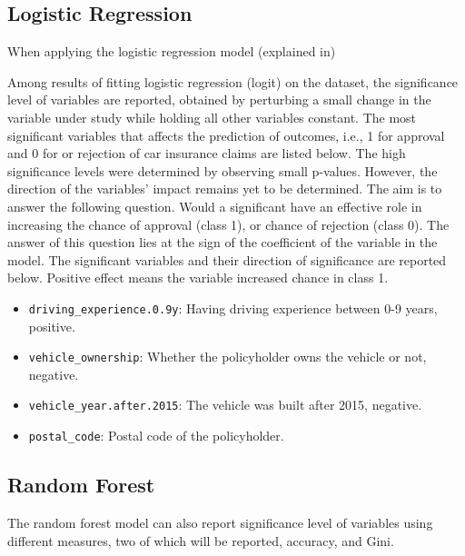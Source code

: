 \documentclass{article}
\providecommand{\tightlist}{%
  \setlength{\itemsep}{0pt}\setlength{\parskip}{0pt}}
\begin{document}
\hypertarget{logistic-regression}{%
\subsection{\texorpdfstring{Logistic Regression
\label{subsec:logit}}{Logistic Regression }}\label{logistic-regression}}

When applying the logistic regression model (explained in)

Among results of fitting logistic regression (logit) on the dataset, the
significance level of variables are reported, obtained by perturbing a
small change in the variable under study while holding all other
variables constant. The most significant variables that affects the
prediction of outcomes, i.e., 1 for approval and 0 for or rejection of
car insurance claims are listed below. The high significance levels were
determined by observing small p-values. However, the direction of the
variables' impact remains yet to be determined. The aim is to answer the
following question. Would a significant have an effective role in
increasing the chance of approval (class 1), or chance of rejection
(class 0). The answer of this question lies at the sign of the
coefficient of the variable in the model. The significant variables and
their direction of significance are reported below. Positive effect
means the variable increased chance in class 1.

\begin{itemize}
\tightlist
\item
  \texttt{driving\_experience.0.9y}: Having driving experience between
  0-9 years, positive.
\item
  \texttt{vehicle\_ownership}: Whether the policyholder owns the vehicle
  or not, negative.
\item
  \texttt{vehicle\_year.after.2015}: The vehicle was built after 2015,
  negative.
\item
  \texttt{postal\_code}: Postal code of the policyholder.
\end{itemize}

\hypertarget{random-forest}{%
\subsection{\texorpdfstring{Random Forest
\label{subsec:rf}}{Random Forest }}\label{random-forest}}

The random forest model can also report significance level of variables
using different measures, two of which will be reported, accuracy, and
Gini.
\end{document}
